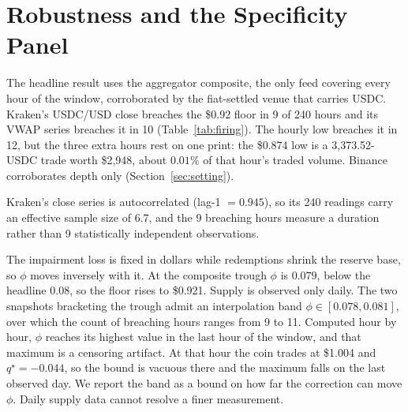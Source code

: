 \section{Robustness and the Specificity Panel}
\label{sec:sensitivity}

The headline result uses the aggregator composite, the only feed covering every hour of
the window, corroborated by the fiat-settled venue that carries USDC. Kraken's
USDC/USD close breaches the \$0.92 floor in 9 of 240 hours and its VWAP series
breaches it in 10 (Table~\ref{tab:firing}). The hourly low breaches it in 12, but the
three extra hours rest on one print: the \$0.874 low is a 3,373.52-USDC trade worth
\$2,948, about $0.01\%$ of that hour's traded volume. Binance corroborates depth only
(Section~\ref{sec:setting}).


Kraken's close series is autocorrelated (lag-1 $=0.945$), so its 240 readings carry an
effective sample size of $6.7$, and the 9 breaching hours measure a duration rather
than 9 statistically independent observations.

The impairment loss is fixed in dollars while redemptions shrink the reserve base, so
$\phi$ moves inversely with it. At the composite trough $\phi$ is $0.079$, below the headline
$0.08$, so the floor rises to \$0.921. Supply is observed only daily. The two
snapshots bracketing the trough admit an interpolation band $\phi\in[0.078,0.081]$, over
which the count of breaching hours ranges from 9 to 11. Computed hour by hour, $\phi$
reaches its highest value in the last hour of the window, and that maximum is a censoring
artifact.
At that hour the coin trades at \$1.004 and $q^{\star}=-0.044$, so the bound is vacuous
there and the maximum falls on the last observed day. We report the band as a bound on
how far the correction can move $\phi$. Daily supply data cannot resolve a finer
measurement.

\begin{table}[t]
\centering
\caption{Breaching hours against the \$0.92 floor, over each series' own observed window,
for the feeds that cover the trough: the composite for USDC, DAI, and USDT, and
Kraken's close, VWAP, and low for USDC. Binance is excluded because its series begins after
the trough.}
\label{tab:firing}
\small
\checkwidth{\small}

\end{table}

